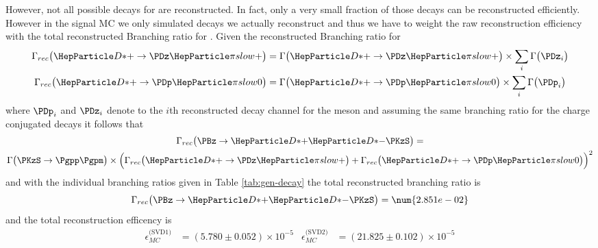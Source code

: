 \documentclass[a4paper]{report}
\def\ReconstructedBR{\num{2.851e-02}}
\def\ReconstructionEffSVDOne{(5.780 \pm 0.052) \times 10^{-5}}
\def\ReconstructionEffSVDTwo{(21.825 \pm 0.102) \times 10^{-5}}
\begin{document}
However, not all possible decays for \ddk are reconstructed. In fact, only a
very small fraction of those decays can be reconstructed efficiently. However in
the signal MC we only simulated decays we actually reconstruct and thus we
have to weight the raw reconstruction efficiency with the total reconstructed
Branching ratio for \ddk. Given the reconstructed Branching ratio for \PDst
\begin{align}
    \BR_{rec}\big(\PDstp \rightarrow \PDz\Pgpps\big) &=
    \BR\big(\PDstp \rightarrow \PDz\Pgpps\big) \times \sum_i \BR\big(\PDz_i\big)\\
    \BR_{rec}\big(\PDstp \rightarrow \PDp\Pgpzs\big) &=
    \BR\big(\PDstp \rightarrow \PDp\Pgpzs\big) \times \sum_i \BR\big(\PDp_i\big)
\end{align}
where $\PDp_i$ and $\PDz_i$ denote to the $i$th reconstructed decay channel for
the \PD meson and assuming the same branching ratio for the charge conjugated
decays it follows that
\begin{multline}
    \BR_{rec}\big(\ddk\big) = \\
    \BR\big(\PKzS \rightarrow \Pgpp\Pgpm \big) \times
    \Big(
    \BR_{rec}\big(\PDstp \rightarrow \PDz\Pgpps\big)
    + \BR_{rec}\big(\PDstp
    \rightarrow \PDp\Pgpzs\big)
    \Big)^2
\end{multline}
and with the individual branching ratios given in Table \ref{tab:gen-decay} the
total reconstructed branching ratio is
\begin{equation}
    \BR_{rec}\big(\ddk\big) = \ReconstructedBR
\end{equation}
and the total reconstruction efficency is
\begin{align}
    \epsilon_{MC}^{\text{(SVD1)}} & = \ReconstructionEffSVDOne &
    \epsilon_{MC}^{\text{(SVD2)}} & = \ReconstructionEffSVDTwo
\end{align}
\end{document}
